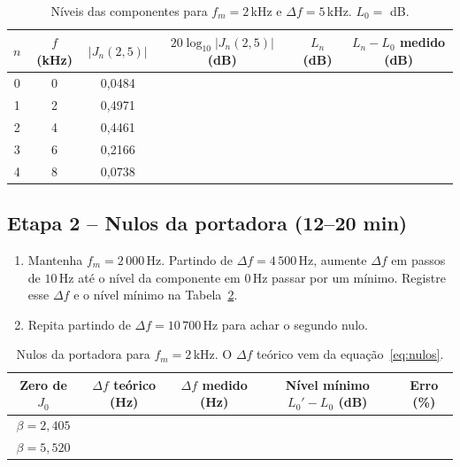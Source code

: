 \documentclass[11pt,a4paper]{article}
\begin{document}
\begin{table}[H]
  \centering
  \begin{tabular}{c c c c c c}
    \toprule
    $n$        & $f$ (kHz)               & $|J_n(2{,}5)|$ & $20\log_{10}|J_n(2{,}5)|$ (dB) &
    $L_n$ (dB) & $L_n - L_0$ medido (dB)                                                         \\
    \midrule
    0          & 0                       & 0,0484         &                                &   & \\
    1          & 2                       & 0,4971         &                                &   & \\
    2          & 4                       & 0,4461         &                                &   & \\
    3          & 6                       & 0,2166         &                                &   & \\
    4          & 8                       & 0,0738         &                                &   & \\
    \bottomrule
  \end{tabular}
  \caption{Níveis das componentes para $f_m = 2$\,kHz e $\Delta f = 5$\,kHz.
    $L_0 = $ \underline{\hspace{2cm}} dB.}
  \label{tab:niveis}
\end{table}

\subsection*{Etapa 2 -- Nulos da portadora (12--20 min)}

\begin{instrucao}[Zeros de $J_0$]
  \begin{enumerate}[label=\arabic*.]
    \item Mantenha $f_m = 2\,000$\,Hz. Partindo de $\Delta f = 4\,500$\,Hz,
          aumente $\Delta f$ em passos de $10$\,Hz até o nível da componente em
          $0$\,Hz passar por um mínimo. Registre esse $\Delta f$ e o nível mínimo
          na Tabela~\ref{tab:nulos}.
    \item Repita partindo de $\Delta f = 10\,700$\,Hz para achar o segundo nulo.
  \end{enumerate}
\end{instrucao}

\begin{table}[H]
  \centering
  \begin{tabular}{c c c c c}
    \toprule
    Zero de $J_0$                & $\Delta f$ teórico (Hz) & $\Delta f$ medido (Hz) &
    Nível mínimo $L_0'-L_0$ (dB) & Erro (\%)                                              \\
    \midrule
    $\beta = 2{,}405$            &                         &                        &   & \\
    $\beta = 5{,}520$            &                         &                        &   & \\
    \bottomrule
  \end{tabular}
  \caption{Nulos da portadora para $f_m = 2$\,kHz. O $\Delta f$ teórico vem da
    equação~\eqref{eq:nulos}.}
  \label{tab:nulos}
\end{table}
\end{document}
